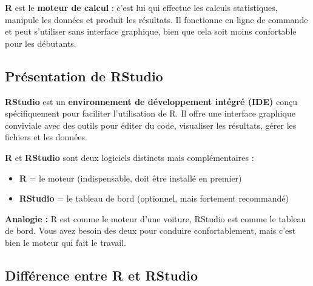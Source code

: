 \documentclass[
  french,
  11pt,
  a4paper,
]{article}
\providecommand{\tightlist}{%
  \setlength{\itemsep}{0pt}\setlength{\parskip}{0pt}}
\begin{document}
\textbf{R} est le \textbf{moteur de calcul} : c'est lui qui effectue les
calculs statistiques, manipule les données et produit les résultats. Il
fonctionne en ligne de commande et peut s'utiliser sans interface
graphique, bien que cela soit moins confortable pour les débutants.

\subsection{Présentation de RStudio}\label{pruxe9sentation-de-rstudio}

\textbf{RStudio} est un \textbf{environnement de développement intégré
(IDE)} conçu spécifiquement pour faciliter l'utilisation de R. Il offre
une interface graphique conviviale avec des outils pour éditer du code,
visualiser les résultats, gérer les fichiers et les données.

\begin{tcolorbox}[enhanced jigsaw, arc=.35mm, bottomrule=.15mm, bottomtitle=1mm, breakable, colback=white, colbacktitle=quarto-callout-important-color!10!white, colframe=quarto-callout-important-color-frame, coltitle=black, left=2mm, leftrule=.75mm, opacityback=0, opacitybacktitle=0.6, rightrule=.15mm, title=\textcolor{quarto-callout-important-color}{\faExclamation}\hspace{0.5em}{À retenir --- R et RStudio : deux logiciels distincts}, titlerule=0mm, toprule=.15mm, toptitle=1mm]

\textbf{R} et \textbf{RStudio} sont deux logiciels distincts mais
complémentaires :

\begin{itemize}
\tightlist
\item
  \textbf{R} = le moteur (indispensable, doit être installé en premier)
\item
  \textbf{RStudio} = le tableau de bord (optionnel, mais fortement
  recommandé)
\end{itemize}

\textbf{Analogie :} R est comme le moteur d'une voiture, RStudio est
comme le tableau de bord. Vous avez besoin des deux pour conduire
confortablement, mais c'est bien le moteur qui fait le travail.

\end{tcolorbox}

\subsection{Différence entre R et
RStudio}\label{diffuxe9rence-entre-r-et-rstudio}
\end{document}
